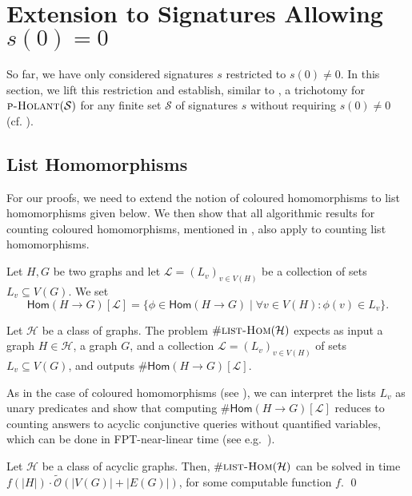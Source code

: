 \documentclass[authorcolumns,numberwithinsect]{no-lipics-v2022}
\newcommand{\homs}[2]{\mathsf{Hom}(#1 \to #2)}
\newcommand{\listhomsprob}
{\text{\sc{list-Hom}}}
\newcommand{\holantprob}{\text{\sc{p-Holant}}}
\begin{document}
\section{Extension to Signatures Allowing $s(0) = 0$}\label{sec:sig0}

So far, we have only considered signatures $s$ restricted to $s(0) \neq 0$. In this section, we lift this restriction and establish, similar to , a trichotomy for $\holantprob(\mathcal{S})$ for any finite set $\mathcal{S}$ of signatures $s$ without requiring $s(0) \neq 0$ (cf. ).

\subsection{List Homomorphisms}

For our proofs, we need to extend the notion of coloured homomorphisms to list homomorphisms given below. We then show that all algorithmic results for counting coloured homomorphisms, mentioned in , also apply to counting list homomorphisms.

\begin{definition}\label{def:listHoms}
Let $H, G$ be two graphs and let $\mathcal{L} = (L_v)_{v\in V(H)}$ be a collection of sets $L_v \subseteq V(G)$. We set
\[
\homs{H}{G}[\mathcal{L}] = \{\phi \in \homs{H}{G} \mid \forall v \in V(H) : \phi(v) \in L_v\}.
\]
\end{definition}

\begin{definition}
Let $\mathcal{H}$ be a class of graphs. The problem $\#\listhomsprob(\mathcal{H})$ expects as input a graph $H \in \mathcal{H}$, a graph $G$, and a collection $\mathcal{L} = (L_v)_{v\in V(H)}$ of sets $L_v \subseteq V(G)$, and outputs $\#\homs{H}{G}[\mathcal{L}]$.
\end{definition}

As in the case of coloured homomorphisms (see ), we can interpret the lists $L_v$ as unary predicates and show that computing $\#\homs{H}{G}[\mathcal{L}]$ reduces to counting answers to acyclic conjunctive queries without quantified variables, which can be done in FPT-near-linear time (see e.g.\ \cite[Theorem 7]{BeraGLSS22}).

\begin{lemma}\label{lem:listHomsLinear}
Let $\mathcal{H}$ be a class of acyclic graphs. Then, $\#\listhomsprob(\mathcal{H})$ can be solved in time $f(|H|)\cdot\tilde{\mathcal{O}}(|V(G)| + |E(G)|)$, for some computable function $f$.   \qed 
\end{lemma}
\end{document}
